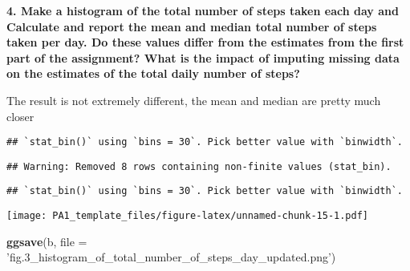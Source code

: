 \documentclass[]{article}
\newenvironment{Shaded}{\begin{snugshade}}{\end{snugshade}}
\newcommand{\DataTypeTok}[1]{\textcolor[rgb]{0.13,0.29,0.53}{#1}}
\newcommand{\FloatTok}[1]{\textcolor[rgb]{0.00,0.00,0.81}{#1}}
\newcommand{\KeywordTok}[1]{\textcolor[rgb]{0.13,0.29,0.53}{\textbf{#1}}}
\newcommand{\NormalTok}[1]{#1}
\newcommand{\OperatorTok}[1]{\textcolor[rgb]{0.81,0.36,0.00}{\textbf{#1}}}
\newcommand{\StringTok}[1]{\textcolor[rgb]{0.31,0.60,0.02}{#1}}
\begin{document}
\textbf{4. Make a histogram of the total number of steps taken each day
and Calculate and report the mean and median total number of steps taken
per day. Do these values differ from the estimates from the first part
of the assignment? What is the impact of imputing missing data on the
estimates of the total daily number of steps?}

The result is not extremely different, the mean and median are pretty
much closer

\begin{Shaded}
\end{Shaded}

\begin{verbatim}
## `stat_bin()` using `bins = 30`. Pick better value with `binwidth`.
\end{verbatim}

\begin{verbatim}
## Warning: Removed 8 rows containing non-finite values (stat_bin).
\end{verbatim}

\begin{verbatim}
## `stat_bin()` using `bins = 30`. Pick better value with `binwidth`.
\end{verbatim}

\texttt{[image: PA1\_template\_files/figure-latex/unnamed-chunk-15-1.pdf]}

\begin{Shaded}
\begin{Highlighting}[]
\KeywordTok{ggsave}\NormalTok{(b, }\DataTypeTok{file =} \StringTok{'fig.3_histogram_of_total_number_of_steps_day_updated.png'}\NormalTok{)}
\end{Highlighting}
\end{Shaded}
\end{document}

